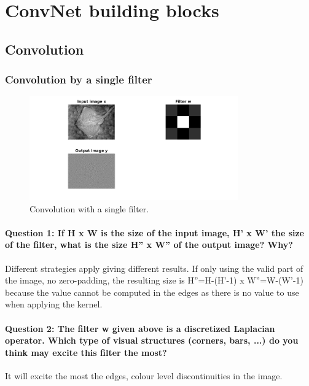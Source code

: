 \documentclass[12pt]{article}
\begin{document}
\maketitle

\section{ConvNet building blocks}
\subsection{Convolution}
\subsubsection{Convolution by a single filter}

\begin{figure}[htbp]
 \centering
 \includegraphics[width=0.8\textwidth]{conv}
 \caption{Convolution with a single filter.}
 \label{fig:q1}
\end{figure}

\paragraph{Question 1: If H x W is the size of the input image, H' x W' the size of the filter, what is the size H'' x W'' of the output image? Why?}
Different strategies apply giving different results. If only using the valid part of the image, no zero-padding, the resulting size is H''=H-(H'-1) x W''=W-(W'-1) because the value cannot be computed in the edges as there is no value to use when applying the kernel.
\paragraph{Question 2: The filter w given above is a discretized Laplacian operator. Which type of visual structures (corners, bars, ...) do you think may excite this filter the most?}
It will excite the most the edges, colour level discontinuities in the image.
\end{document}
